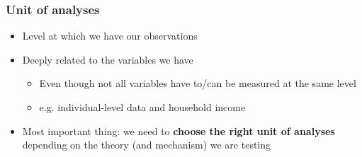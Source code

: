 \documentclass[aspectratio=43]{beamer}
\begin{document}



\begin{frame}
\frametitle{Unit of analyses}
\centering

\begin{itemize}
  \item Level at which we have our observations
  \item Deeply related to the variables we have
  \begin{itemize}
    \item Even though not all variables have to/can be measured at the same level
    \item<2-> e.g. individual-level data and household income
  \end{itemize}
  \item<3-> Most important thing: we need to \textbf{choose the right unit of analyses} depending on the theory (and mechanism) we are testing
\end{itemize}


\end{frame}
\end{document}
